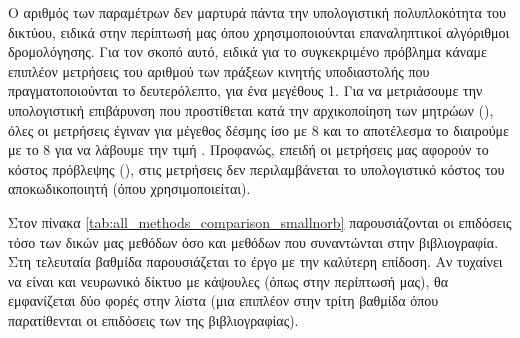 Ο αριθμός των παραμέτρων δεν μαρτυρά πάντα την υπολογιστική πολυπλοκότητα του δικτύου, ειδικά στην περίπτωσή μας όπου χρησιμοποιούνται επαναληπτικοί αλγόριθμοι δρομολόγησης. Για τον σκοπό αυτό, ειδικά για το συγκεκριμένο πρόβλημα κάναμε επιπλέον μετρήσεις του αριθμού των πράξεων κινητής υποδιαστολής που πραγματοποιούνται το δευτερόλεπτο, για ένα  μεγέθους 1. Για να μετριάσουμε την υπολογιστική επιβάρυνση που προστίθεται κατά την αρχικοποίηση των μητρώων (), όλες οι μετρήσεις έγιναν για μέγεθος δέσμης ίσο με 8 και το αποτέλεσμα το διαιρούμε με το 8 για να λάβουμε την τιμή . Προφανώς, επειδή οι μετρήσεις μας αφορούν το κόστος πρόβλεψης (), στις μετρήσεις δεν περιλαμβάνεται το υπολογιστικό κόστος του αποκωδικοποιητή (όπου χρησιμοποιείται).\par

Στον πίνακα \ref{tab:all_methods_comparison_smallnorb} παρουσιάζονται οι επιδόσεις τόσο των δικών μας μεθόδων όσο και μεθόδων που συναντώνται στην βιβλιογραφία. Στη τελευταία βαθμίδα παρουσιάζεται το έργο με την καλύτερη επίδοση. Αν τυχαίνει να είναι και νευρωνικό δίκτυο με κάψουλες (όπως στην περίπτωσή μας), θα εμφανίζεται δύο φορές στην λίστα (μια επιπλέον στην τρίτη βαθμίδα όπου παρατίθενται οι επιδόσεις των  της βιβλιογραφίας).

